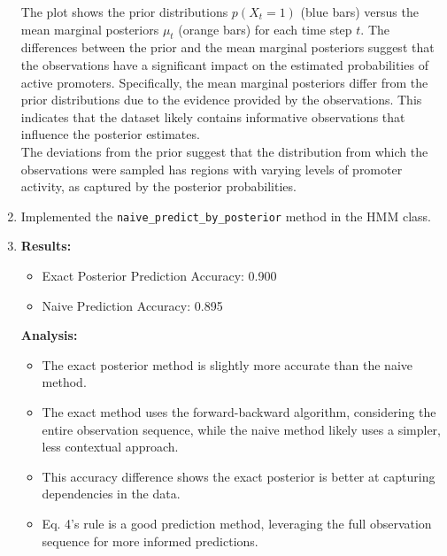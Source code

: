 \documentclass[a4 paper]{article}
\begin{document}
\begin{enumerate}
    
    The plot shows the prior distributions $p(X_t = 1)$ (blue bars) versus the mean marginal posteriors $\mu_t$ 
    (orange bars) for each time step $t$. The differences between the prior and the mean marginal posteriors suggest
     that the observations have a significant impact on the estimated probabilities of active promoters. 
     Specifically, the mean marginal posteriors differ from the prior distributions due to the evidence provided 
     by the observations. This indicates that the dataset likely contains informative observations that influence the 
     posterior estimates. \\
     The deviations from the prior suggest that the distribution from which the observations were sampled has regions with
      varying levels of promoter activity, as captured by the posterior probabilities.
    

    \item {}

    Implemented the \texttt{naive\_predict\_by\_posterior} method in the HMM class.
    

    \item {}

    \textbf{Results:}
    \begin{itemize}
        \item Exact Posterior Prediction Accuracy: 0.900
        \item Naive Prediction Accuracy: 0.895
    \end{itemize}
    
    \textbf{Analysis:}
    \begin{itemize}
        \item The exact posterior method is slightly more accurate than the naive method.
        \item The exact method uses the forward-backward algorithm, considering the entire observation sequence, 
            while the naive method likely uses a simpler, less contextual approach.
        \item This accuracy difference shows the exact posterior is better at capturing dependencies in the data.
        \item Eq. 4's rule is a good prediction method, leveraging the full observation sequence for more informed predictions.
    \end{itemize}

\end{enumerate}
\end{document}
